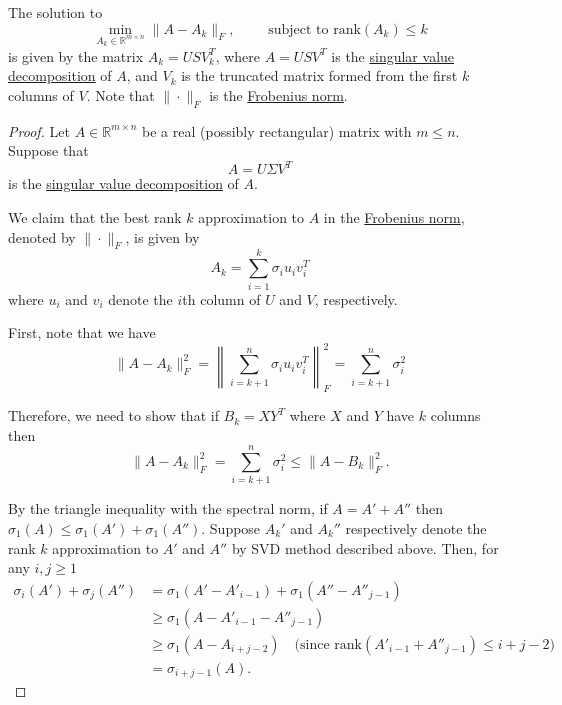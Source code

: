   \begin{theorem}
    \label{thm:eckart-young-theorem}
    The solution to 
    \begin{equation}
      \min_{A_k \in \mathbb{R}^{m \times n}} \| A - A_k \|_F, \qquad \text{ subject to } \mathrm{rank}(A_k) \leq k
    \end{equation} 
    is given by the matrix $A_k = U S V_k^T$, where $A = U S V^T$ is the \hyperref[lin-thm:singular-value-decomposition]{singular value decomposition} of $A$, and $V_k$ is the truncated matrix formed from the first $k$ columns of $V$. Note that $\| \cdot \|_F$ is the \hyperref[lin-def:frobenius-norm-2]{Frobenius norm}. 
  \end{theorem}
  \begin{proof}
    Let $A \in \mathbb{R}^{m \times n}$ be a real (possibly rectangular) matrix with $m \leq n$. Suppose that
    \begin{equation}
      A = U\Sigma V^T
    \end{equation}
    is the \hyperref[lin-thm:singular-value-decomposition]{singular value decomposition} of $A$.

    We claim that the best rank $k$ approximation to $A$ in the \hyperref[lin-def:frobenius-norm-2]{Frobenius norm}, denoted by $\| \cdot \|_F$, is given by
    \begin{equation}
      A_k = \sum_{i=1}^k \sigma_i u_i v_i^T
    \end{equation}
    where $u_i$ and $v_i$ denote the $i$th column of $U$ and $V$, respectively.

    First, note that we have
    \begin{equation}
      \|A - A_k\|_F^2 = \left\|\sum_{i=k+1}^n \sigma_i u_i v_i^T\right\|_F^2 = \sum_{i=k+1}^n \sigma_i^2
    \end{equation}

    Therefore, we need to show that if $B_k = XY^T$ where $X$ and $Y$ have $k$ columns then
    \begin{equation}
      \|A - A_k\|_F^2 = \sum_{i=k+1}^n \sigma_i^2 \leq \|A - B_k\|_F^2.
    \end{equation}

    By the triangle inequality with the spectral norm, if $A = A' + A''$ then $\sigma_1(A) \leq \sigma_1(A') + \sigma_1(A'')$. Suppose $A_k'$ and $A_k''$ respectively denote the rank $k$ approximation to $A'$ and $A''$ by SVD method described above. Then, for any $i, j \geq 1$
    \begin{align}
      \sigma_i(A') + \sigma_j(A'') &= \sigma_1(A' - A'_{i-1}) + \sigma_1(A'' - A''_{j-1}) \\
      &\geq \sigma_1(A - A'_{i-1} - A''_{j-1}) \\
      &\geq \sigma_1(A - A_{i+j-2}) \quad \text{(since $\text{rank}(A'_{i-1} + A''_{j-1}) \leq i + j - 2$)} \\
      &= \sigma_{i+j-1}(A).
    \end{align}


\end{proof}
